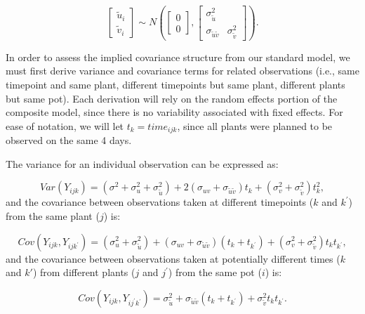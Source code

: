 \documentclass[
]{krantz}
\begin{document}
\[ \left[ \begin{array}{c}
            \tilde{u}_{i} \\ \tilde{v}_{i}
          \end{array}  \right] \sim N \left( \left[
          \begin{array}{c}
            0 \\ 0
          \end{array} \right], \left[
          \begin{array}{cc}
            \sigma_{\tilde{u}}^{2} & \\
            \sigma_{\tilde{u}\tilde{v}} & \sigma_{\tilde{v}}^{2}
          \end{array} \right] \right). \]

In order to assess the implied covariance structure from our standard model, we must first derive variance and covariance terms for related observations (i.e., same timepoint and same plant, different timepoints but same plant, different plants but same pot). Each derivation will rely on the random effects portion of the composite model, since there is no variability associated with fixed effects. For ease of notation, we will let \(t_{k}=\textstyle{time}_{ijk}\), since all plants were planned to be observed on the same 4 days.

The variance for an individual observation can be expressed as:

\begin{equation}
Var(Y_{ijk}) = (\sigma^{2} + \sigma_{u}^{2} + \sigma_{\tilde{u}}^{2}) + 2(\sigma_{uv} + \sigma_{\tilde{u}\tilde{v}})t_k + (\sigma_{v}^{2} + \sigma_{\tilde{v}}^{2})t_{k}^{2},
\label{eq:var}
\end{equation}
and the covariance between observations taken at different timepoints (\(k\) and \(k^{'}\)) from the same plant (\(j\)) is:

\begin{equation}
Cov(Y_{ijk},Y_{ijk^{'}}) = (\sigma_{u}^{2} + \sigma_{\tilde{u}}^{2}) + (\sigma_{uv} + \sigma_{\tilde{u}\tilde{v}})(t_{k}+t_{k^{'}}) + 
(\sigma_{v}^{2} + \sigma_{\tilde{v}}^{2})t_{k}t_{k^{'}},
\label{eq:cov1}
\end{equation}
and the covariance between observations taken at potentially different times (\(k\) and \(k'\)) from different plants (\(j\) and \(j^{'}\)) from the same pot (\(i\)) is:

\begin{equation}
Cov(Y_{ijk},Y_{ij^{'}k^{'}}) = \sigma_{\tilde{u}}^{2} + \sigma_{\tilde{u}\tilde{v}}(t_{k}+t_{k^{'}}) + \sigma_{\tilde{v}}^{2}t_{k}t_{k^{'}}.
\label{eq:cov2}
\end{equation}
\end{document}
